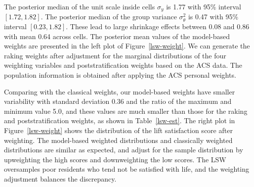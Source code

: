 \documentclass[11pt]{article}
\begin{document}
The posterior median of the unit scale inside cells $\sigma_y$ is 1.77 with 95\% interval $[1.72,1.82]$. The posterior median of the group variance $\sigma_{\theta}^2$ is 0.47 with 95\% interval $[0.23, 1.82]$. These lead to large shrinkage effects between 0.08 and 0.86 with mean 0.64 across cells. The posterior mean values of the model-based weights are presented in the left plot of Figure~\ref{lsw-weight}. We can generate the raking weights after adjustment for the marginal distributions of the four weighting variables and poststratification weights based on the ACS data. The population information is obtained after applying the ACS personal weights.

Comparing with the classical weights, our model-based weights have smaller variability with standard deviation 0.36 and the ratio of the maximum and minimum value 5.0, and these values are much smaller than those for the raking and poststratification weights, as shown in Table~\ref{lsw-est}. The right plot in Figure~\ref{lsw-weight} shows the distribution of the lift satisfaction score after weighting. The model-based weighted distributions and classically weighted distributions are similar as expected, and adjust for the sample distribution by upweighting the high scores and downweighting the low scores. The LSW oversamples poor residents who tend not be satisfied with life, and the weighting adjustment balances the discrepancy.

\end{document}
